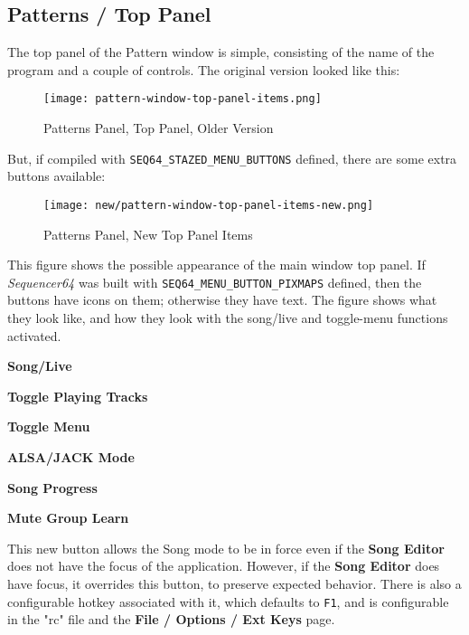 \subsection{Patterns / Top Panel}
\label{subsec:seq64_patterns_panel_top}

   The top panel of the Pattern window is simple, consisting of the name of
   the program and a couple of controls.  The original version looked like
   this:

\begin{figure}[H]
   \centering 
   \texttt{[image: pattern-window-top-panel-items.png]}
   \caption{Patterns Panel, Top Panel, Older Version}
   \label{fig:pattern_window_top_panel_items}
\end{figure}

   But, if compiled with \texttt{SEQ64\_STAZED\_MENU\_BUTTONS} defined,
   there are some extra buttons available:

\begin{figure}[H]
   \centering 
   \texttt{[image: new/pattern-window-top-panel-items-new.png]}
   \caption{Patterns Panel, New Top Panel Items}
   \label{fig:pattern_window_new_top_panel_items}
\end{figure}

   This figure shows the possible appearance of the main window top panel.
   If \textsl{Sequencer64} was built with
   \texttt{SEQ64\_MENU\_BUTTON\_PIXMAPS} defined, then the buttons have icons
   on them; otherwise they have text.  The figure shows what they look like,
   and how they look with the song/live and toggle-menu functions activated.
 
   \begin{enumber}
      \item \textbf{Song/Live}
      \item \textbf{Toggle Playing Tracks}
      \item \textbf{Toggle Menu}
      \item \textbf{ALSA/JACK Mode}
      \item \textbf{Song Progress}
      \item \textbf{Mute Group Learn}
   \end{enumber}

   \setcounter{ItemCounter}{0}      %

   This new button allows the Song mode to be in force even if
   the \textbf{Song Editor} does not have the focus of the application.
   However, if the \textbf{Song Editor} does have focus, it overrides this
   button, to preserve expected behavior.
   There is also a configurable hotkey associated with it,
   which defaults to \texttt{F1}, and is configurable in the "rc" file and
   the \textbf{File / Options / Ext Keys} page.

